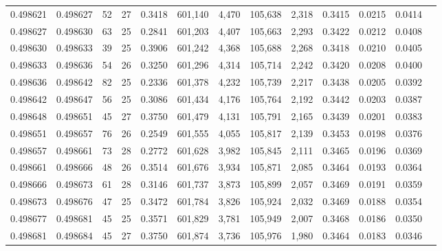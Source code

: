 \begin{tabular}{rrrrrrrrrrrrr}
0.498621 & 0.498627 &  52 &  27 &                                     0.3418 & 601,140 &   4,470 & 105,638 &   2,318 & 0.3415 & 0.0215 & 0.0414 \\
0.498627 & 0.498630 &  63 &  25 &                                     0.2841 & 601,203 &   4,407 & 105,663 &   2,293 & 0.3422 & 0.0212 & 0.0408 \\
0.498630 & 0.498633 &  39 &  25 &                                     0.3906 & 601,242 &   4,368 & 105,688 &   2,268 & 0.3418 & 0.0210 & 0.0405 \\
0.498633 & 0.498636 &  54 &  26 &                                     0.3250 & 601,296 &   4,314 & 105,714 &   2,242 & 0.3420 & 0.0208 & 0.0400 \\
0.498636 & 0.498642 &  82 &  25 &                                     0.2336 & 601,378 &   4,232 & 105,739 &   2,217 & 0.3438 & 0.0205 & 0.0392 \\
0.498642 & 0.498647 &  56 &  25 &                                     0.3086 & 601,434 &   4,176 & 105,764 &   2,192 & 0.3442 & 0.0203 & 0.0387 \\
0.498648 & 0.498651 &  45 &  27 &                                     0.3750 & 601,479 &   4,131 & 105,791 &   2,165 & 0.3439 & 0.0201 & 0.0383 \\
0.498651 & 0.498657 &  76 &  26 &                                     0.2549 & 601,555 &   4,055 & 105,817 &   2,139 & 0.3453 & 0.0198 & 0.0376 \\
0.498657 & 0.498661 &  73 &  28 &                                     0.2772 & 601,628 &   3,982 & 105,845 &   2,111 & 0.3465 & 0.0196 & 0.0369 \\
0.498661 & 0.498666 &  48 &  26 &                                     0.3514 & 601,676 &   3,934 & 105,871 &   2,085 & 0.3464 & 0.0193 & 0.0364 \\
0.498666 & 0.498673 &  61 &  28 &                                     0.3146 & 601,737 &   3,873 & 105,899 &   2,057 & 0.3469 & 0.0191 & 0.0359 \\
0.498673 & 0.498676 &  47 &  25 &                                     0.3472 & 601,784 &   3,826 & 105,924 &   2,032 & 0.3469 & 0.0188 & 0.0354 \\
0.498677 & 0.498681 &  45 &  25 &                                     0.3571 & 601,829 &   3,781 & 105,949 &   2,007 & 0.3468 & 0.0186 & 0.0350 \\
0.498681 & 0.498684 &  45 &  27 &                                     0.3750 & 601,874 &   3,736 & 105,976 &   1,980 & 0.3464 & 0.0183 & 0.0346 \\

\end{tabular}

